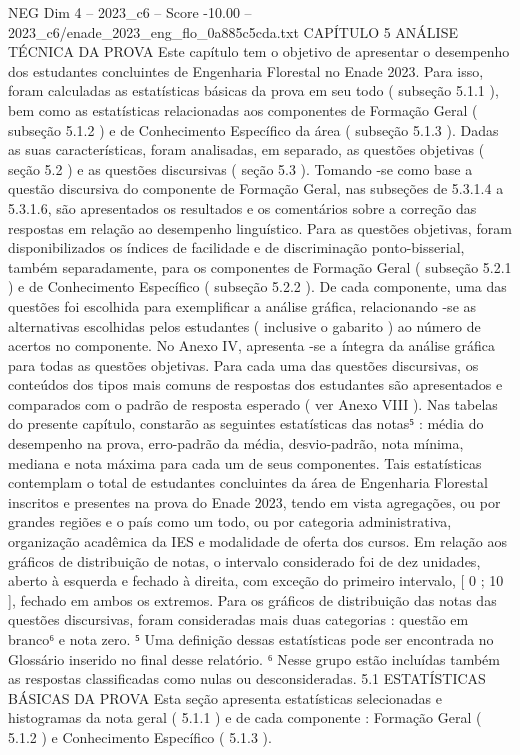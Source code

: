 \begin{textsample}{NEG Dim 4 – 2023\_c6 – Score -10.00 – 2023\_c6/enade\_2023\_eng\_flo\_0a885c5cda.txt}  \label{ex:f4_neg_001}
CAPÍTULO 5 ANÁLISE TÉCNICA DA PROVA Este capítulo tem o objetivo de apresentar o desempenho dos estudantes concluintes de Engenharia Florestal no Enade 2023.
Para isso, foram calculadas as estatísticas básicas da prova em seu todo ( subseção 5.1.1 ), bem como as estatísticas relacionadas aos componentes de Formação Geral ( subseção 5.1.2 ) e de Conhecimento Específico da área ( subseção 5.1.3 ).
Dadas as suas características, foram analisadas, em separado, as questões objetivas ( seção 5.2 ) e as questões discursivas ( seção 5.3 ).
Tomando -se como base a questão discursiva do componente de Formação Geral, nas subseções de 5.3.1.4 a 5.3.1.6, são apresentados os resultados e os comentários sobre a correção das respostas em relação ao desempenho linguístico.
Para as questões objetivas, foram disponibilizados os índices de facilidade e de discriminação ponto-bisserial, também separadamente, para os componentes de Formação Geral ( subseção 5.2.1 ) e de Conhecimento Específico ( subseção 5.2.2 ).
De cada componente, uma das questões foi escolhida para exemplificar a análise gráfica, relacionando -se as alternativas escolhidas pelos estudantes ( inclusive o gabarito ) ao número de acertos no componente.
No Anexo IV, apresenta -se a íntegra da análise gráfica para todas as questões objetivas.
Para cada uma das questões discursivas, os conteúdos dos tipos mais comuns de respostas dos estudantes são apresentados e comparados com o padrão de resposta esperado ( ver Anexo VIII ).
Nas tabelas do presente capítulo, constarão as seguintes estatísticas das notas⁵ : média do desempenho na prova, erro-padrão da média, desvio-padrão, nota mínima, mediana e nota máxima para cada um de seus componentes.
Tais estatísticas contemplam o total de estudantes concluintes da área de Engenharia Florestal inscritos e presentes na prova do Enade 2023, tendo em vista agregações, ou por grandes regiões e o país como um todo, ou por categoria administrativa, organização acadêmica da IES e modalidade de oferta dos cursos.
Em relação aos gráficos de distribuição de notas, o intervalo considerado foi de dez unidades, aberto à esquerda e fechado à direita, com exceção do primeiro intervalo, [ 0 ; 10 ], fechado em ambos os extremos.
Para os gráficos de distribuição das notas das questões discursivas, foram consideradas mais duas categorias : questão em branco⁶ e nota zero. ⁵ Uma definição dessas estatísticas pode ser encontrada no Glossário inserido no final desse relatório. ⁶ Nesse grupo estão incluídas também as respostas classificadas como nulas ou desconsideradas. 5.1 ESTATÍSTICAS BÁSICAS DA PROVA Esta seção apresenta estatísticas selecionadas e histogramas da nota geral ( 5.1.1 ) e de cada componente : Formação Geral ( 5.1.2 ) e Conhecimento Específico ( 5.1.3 ).

\end{textsample}
